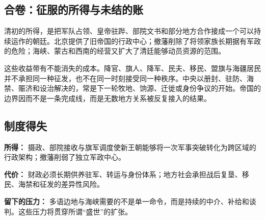 \subsection{合卷：征服的所得与未结的账}

清初的所得，是把军队占领、皇帝驻跸、部院文书和部分地方合作接成一个可以持续运作的朝廷。北京提供了旧帝国的行政中心；撤藩削除了将领家族长期据有军政的危险；海峡、蒙古和西南的经营又扩大了清廷能够动员资源的范围。

这些收益带有不能消失的成本。降官、旗人、降军、民夫、移民、盟旗与海疆居民并不承担同一种征发，也不在同一时刻接受同一种秩序。中央以册封、驻防、海禁、赈济和设治解决的，常是下一轮牧地、饷源、迁徙或身份争议的开始。帝国的边界因而不是一条完成线，而是无数地方关系被反复接入的结果。

\subsection{制度得失}

\textbf{所得：} 摄政、部院接收与旗军调度使新王朝能够将一次军事突破转化为跨区域的行政架构；撤藩削弱了独立军政中心。

\textbf{代价：} 财政必须长期供养驻军、转运与身份体系；地方社会承担战后复垦、移民、海禁和征发的差异性风险。

\textbf{留下的压力：} 多语边地与海峡需要的不是单一命令，而是持续的中介、补给和谈判。这些压力将贯穿所谓“盛世”的扩张。
